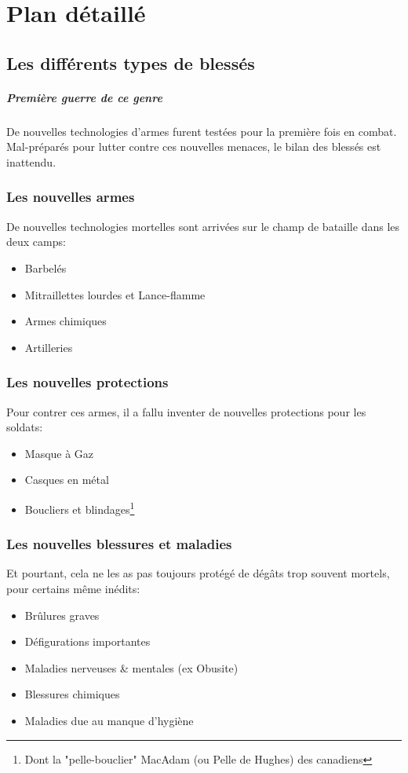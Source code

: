 \documentclass[a4paper, BCOR=0mm, fontsize=12pt, titlepage=firstiscover]{scrreprt}
\begin{document}
	
	\chapter{Plan détaillé}
	\section{Les différents types de blessés}
		\paragraph{Première guerre de ce genre}
		De nouvelles technologies d'armes furent testées pour la première fois en combat.
		Mal-préparés pour lutter contre ces nouvelles menaces, le bilan des blessés est inattendu.
	
		\subsection{Les nouvelles armes}
			De nouvelles technologies mortelles sont arrivées sur le champ de bataille dans les deux camps:
			\begin{itemize}
				\item Barbelés
				\item Mitraillettes lourdes et Lance-flamme
				\item Armes chimiques
				\item Artilleries
			\end{itemize}
		\subsection{Les nouvelles protections}
			Pour contrer ces armes, il a fallu inventer de nouvelles protections pour les soldats:
			\begin{itemize}
				\item Masque à Gaz
				\item Casques en métal
				\item Boucliers et blindages\footnote{Dont la "pelle-bouclier" MacAdam (ou Pelle de Hughes) des canadiens}
			\end{itemize}
		\subsection{Les nouvelles blessures et maladies}
			Et pourtant, cela ne les as pas toujours protégé de dégâts trop souvent mortels, pour certains même inédits:
			\begin{itemize}
				\item Brûlures graves
				\item Défigurations importantes 
				\item Maladies nerveuses \& mentales (ex Obusite)
				\item Blessures chimiques
				\item Maladies due au manque d'hygiène
			\end{itemize}
		
\end{document}
